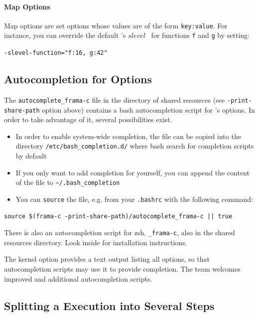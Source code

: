 \paragraph{Map Options}

Map options are set options whose values are of the form \texttt{key:value}. For
instance, you can override the default \Value's $slevel$~\cite{value} for
functions \texttt{f} and \texttt{g} by setting:
\begin{commands}
\texttt{-slevel-function="f:16, g:42"}
\end{commands}

\subsection{Autocompletion for Options}

The \texttt{autocomplete\_frama-c} file in the directory of shared resources
(see \texttt{-print-share-path} option above) contains a
bash autocompletion script for \FramaC's options. In order to take advantage
of it, several possibilities exist.
\begin{itemize}
\item In order to enable system-wide completion, the file can be copied
  into the directory \texttt{/etc/bash\_completion.d/} where bash search for
  completion scripts by default
\item If you only want to add completion for yourself, you can append the
content of the file to \texttt{\~{}/.bash\_completion}
\item You can \texttt{source} the file, e.g. from your \texttt{.bashrc} with
the following command:
\end{itemize}
\begin{verbatim}
source $(frama-c -print-share-path)/autocomplete_frama-c || true
\end{verbatim}


There is also an autocompletion script for zsh, \texttt{\_frama-c}, also
in the shared resources directory. Look inside for installation instructions.

The kernel option  provides a text output listing
all \FramaC options, so that autocompletion scripts may use it to provide
completion. The \FramaC team welcomes improved and additional autocompletion
scripts.

\subsection{Splitting a \FramaC Execution into Several Steps}\label{sec:then}

